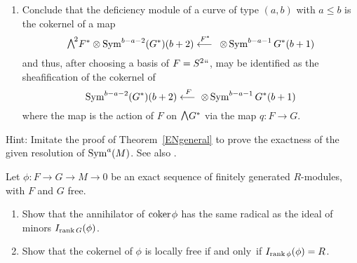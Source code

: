 \begin{exercise}
\begin{enumerate}
\item Conclude that the deficiency module of a curve of type $(a, b)$
with $a\leq b$ is the cokernel of a map
$$
\mwedge^2 F^* \otimes \Sym^{b-a-2} (G^*)(b+2) \luto{\,F^*}\otimes \Sym^{b-a-1}
G^*(b+1)
$$
and thus, after choosing a basis of $F = S^2` `$, may be identified as
the sheafification of the cokernel of
$$
\Sym^{b-a-2} (G^*)(b+2) \luto {\ F}\otimes \Sym^{b-a-1} G^*(b+1)
$$
where the map is the action of $F$ on $\mwedge \,G^*$ via the map $q:F\to G$.
\end{enumerate}

Hint:  Imitate the proof of Theorem~\ref{ENgeneral} to prove
the exactness of the given resolution of $\operatorname{Sym}^a(M)$. See also
\cite[Appendix A2.6]{Eisenbud1995}.
\end{exercise}

\begin{exercise}
\label{Fitt}
Let $\phi: F\to G \to M\to 0$ be an exact sequence of finitely generated
$R$-modules,
with $F$ and $G$ free.

\begin{enumerate}
\item Show that the annihilator of  ${\rm{coker}\kern1pt} \phi$ has the
same radical as the ideal 
of minors
$I_{\operatorname{rank} G}(\phi)$.
\item 
Show that the cokernel of $\phi$
is locally free if and only~if $I_{\operatorname{rank} \phi}(\phi)= R$.
\end{enumerate}
\end{exercise}


